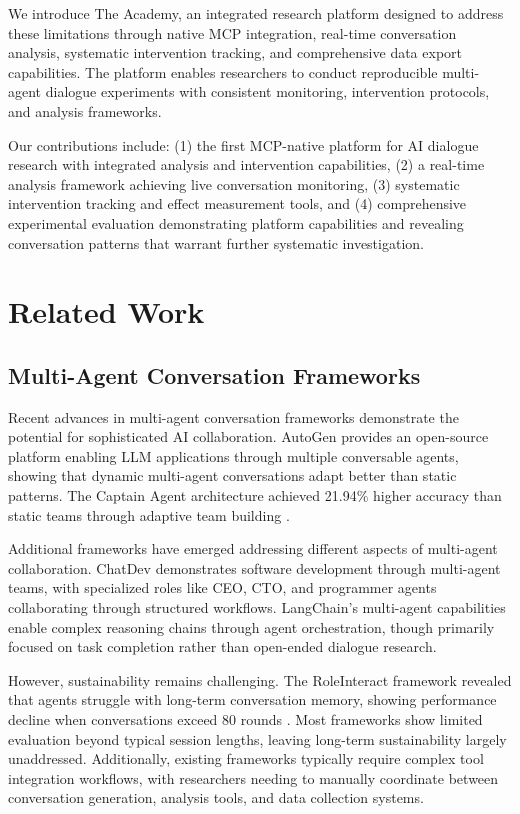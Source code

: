 \documentclass[11pt,letterpaper]{article}
\newcommand{\theacademy}{The Academy}
\newcommand{\mcp}{MCP}
\begin{document}
We introduce \theacademy{}, an integrated research platform designed to address these limitations through native \mcp{} integration, real-time conversation analysis, systematic intervention tracking, and comprehensive data export capabilities. The platform enables researchers to conduct reproducible multi-agent dialogue experiments with consistent monitoring, intervention protocols, and analysis frameworks.

Our contributions include: (1) the first \mcp{}-native platform for AI dialogue research with integrated analysis and intervention capabilities, (2) a real-time analysis framework achieving live conversation monitoring, (3) systematic intervention tracking and effect measurement tools, and (4) comprehensive experimental evaluation demonstrating platform capabilities and revealing conversation patterns that warrant further systematic investigation.

\section{Related Work}

\subsection{Multi-Agent Conversation Frameworks}

Recent advances in multi-agent conversation frameworks demonstrate the potential for sophisticated AI collaboration. AutoGen \citep{wu2023autogen} provides an open-source platform enabling LLM applications through multiple conversable agents, showing that dynamic multi-agent conversations adapt better than static patterns. The Captain Agent architecture achieved 21.94\% higher accuracy than static teams through adaptive team building \citep{song2025adaptive}.

Additional frameworks have emerged addressing different aspects of multi-agent collaboration. ChatDev \citep{qian2023chatdev} demonstrates software development through multi-agent teams, with specialized roles like CEO, CTO, and programmer agents collaborating through structured workflows. LangChain's multi-agent capabilities enable complex reasoning chains through agent orchestration, though primarily focused on task completion rather than open-ended dialogue research.

However, sustainability remains challenging. The RoleInteract framework revealed that agents struggle with long-term conversation memory, showing performance decline when conversations exceed 80 rounds \citep{chen2023chatarena}. Most frameworks show limited evaluation beyond typical session lengths, leaving long-term sustainability largely unaddressed. Additionally, existing frameworks typically require complex tool integration workflows, with researchers needing to manually coordinate between conversation generation, analysis tools, and data collection systems.
\end{document}
